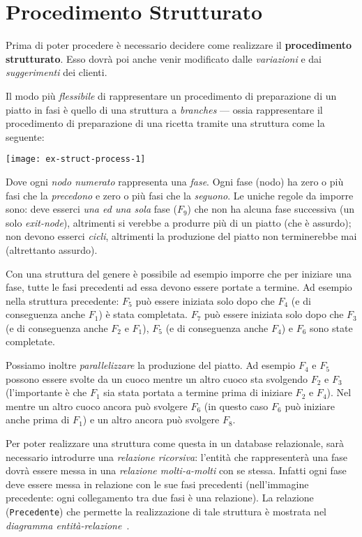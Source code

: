 \section{Procedimento Strutturato}\label{sec:structuredprocess}
Prima di poter procedere è necessario decidere come realizzare il {\bf procedimento strutturato}.
Esso dovrà poi anche venir modificato dalle {\it variazioni} e dai {\it suggerimenti} dei clienti.

Il modo più {\it flessibile} di rappresentare un procedimento di preparazione di un piatto
in fasi è quello di una struttura a {\it branches} --- ossia rappresentare il procedimento
di preparazione di una ricetta tramite una struttura come la seguente:

\vspace{5pt}\centerline{\texttt{[image: ex-struct-process-1]}}

\vspace{15pt}

Dove ogni {\it nodo numerato} rappresenta una {\it fase}. Ogni fase (nodo) ha zero o più fasi
che la {\it precedono} e zero o più fasi che la {\it seguono}. Le uniche regole da imporre
sono: deve esserci {\it una ed una sola} fase ($F_{9}$) che non ha alcuna fase successiva (un
solo {\it exit-node}), altrimenti si verebbe a produrre più di un piatto (che è assurdo); non
devono esserci {\it cicli}, altrimenti la produzione del piatto non terminerebbe mai (altrettanto assurdo).

Con una struttura del genere è possibile ad esempio imporre che per iniziare una fase,
tutte le fasi precedenti ad essa devono essere portate a termine. Ad esempio nella struttura precedente:
$F_{5}$ può essere iniziata solo dopo che $F_{4}$ (e di conseguenza anche $F_{1}$) è stata completata.
$F_{7}$ può essere iniziata solo dopo che $F_{3}$ (e di conseguenza anche $F_{2}$ e $F_{1}$),
$F_{5}$ (e di conseguenza anche $F_{4}$) e $F_{6}$ sono state completate.

Possiamo inoltre {\it parallelizzare} la produzione del piatto. Ad esempio $F_{4}$ e $F_{5}$ possono essere
svolte da un cuoco mentre un altro cuoco sta svolgendo $F_{2}$ e $F_{3}$ (l'importante è che
$F_{1}$ sia stata portata a termine prima di iniziare $F_{2}$ e $F_{4}$). Nel mentre un altro
cuoco ancora può svolgere $F_{6}$ (in questo caso $F_{6}$ può iniziare anche prima di $F_{1}$)
e un altro ancora può svolgere $F_{8}$.

Per poter realizzare una struttura come questa in un database relazionale, sarà necessario
introdurre una {\it relazione ricorsiva}: l'entità che rappresenterà una fase dovrà essere
messa in una {\it relazione molti-a-molti} con se stessa. Infatti ogni fase deve essere
messa in relazione con le sue fasi precedenti (nell'immagine precedente: ogni collegamento
tra due fasi è una relazione).
La relazione ({\tt Precedente}) che permette la realizzazione di tale struttura è mostrata
nel {\it diagramma entità-relazione}~.

%
